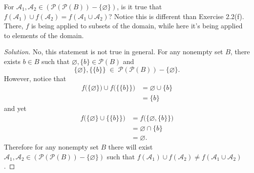 \documentclass[11pt]{article}
\newenvironment{p}[1]{
  \begin{trivlist}
\item[\hskip \labelsep {\bfseries (#1)}]}
  {\end{trivlist}}
\newenvironment{solution}{\begin{proof}[Solution]}{\end{proof}}
\begin{document}
\begin{p}{b}
  For $\mathcal{A}_1, \mathcal{A}_2 \in (\mathscr{P}(\mathscr{P}(B)) -
  \{\varnothing\})$, is it true that $f(\mathcal{A}_1) \cup f(\mathcal{A}_2) =
  f(\mathcal{A}_1 \cup \mathcal{A}_2)$? Notice this is different than Exercise
  2.2(f). There, $f$ is being applied to subsets of the domain, while here it's
  being applied to elements of the domain.
\end{p}

\begin{solution}
  No, this statement is not true in general. For any nonempty set $B$, there
  exists $b \in B$ such that $\varnothing, \{b\} \in \mathscr{P}(B)$ and
  $$\{\varnothing\}, \{\{b\}\} \;\in\; \mathscr{P}(\mathscr{P}(B)) -
  \{\varnothing\}.$$
  However, notice that
  \begin{align*}
    f\big(\{\varnothing\}\big) \cup f\big(\{\{b\}\}\big)
      &= \varnothing \cup \{b\} \\
      &= \{b\}
  \end{align*}
  and yet
  \begin{align*}
    f\big(\{\varnothing\} \cup \{\{b\}\}\big)
      &= f\big(\{\varnothing, \{b\}\}\big) \\
      &= \varnothing \cap \{b\} \\
      &= \varnothing.
  \end{align*}
  Therefore for any nonempty set $B$ there will exist $\mathcal{A}_1,
  \mathcal{A}_2 \in (\mathscr{P}(\mathscr{P}(B)) -
  \{\varnothing\})$ such that $f(\mathcal{A}_1) \cup f(\mathcal{A}_2) \neq
  f(\mathcal{A}_1 \cup \mathcal{A}_2)$.
\end{solution}
\end{document}
